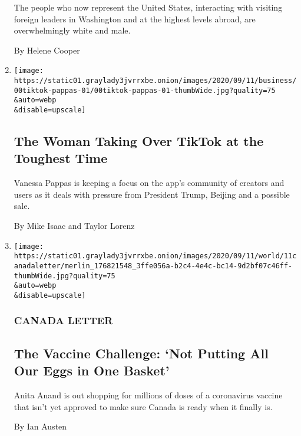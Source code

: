 \begin{enumerate}
  The people who now represent the United States, interacting with
  visiting foreign leaders in Washington and at the highest levels
  abroad, are overwhelmingly white and male.

  By Helene Cooper
\item
  \href{/2020/09/11/technology/tiktok-vanessa-pappas-bytedance.html}{}

  \texttt{[image: https://static01.graylady3jvrrxbe.onion/images/2020/09/11/business/00tiktok-pappas-01/00tiktok-pappas-01-thumbWide.jpg?quality=75\\\&auto=webp\\\&disable=upscale]}

  \hypertarget{the-woman-taking-over-tiktok-at-the-toughest-time}{%
  \subsection{The Woman Taking Over TikTok at the Toughest
  Time}\label{the-woman-taking-over-tiktok-at-the-toughest-time}}

  Vanessa Pappas is keeping a focus on the app's community of creators
  and users as it deals with pressure from President Trump, Beijing and
  a possible sale.

  By Mike Isaac and Taylor Lorenz
\item
  \href{/2020/09/11/world/canada/the-vaccine-challenge-not-putting-all-our-eggs-in-one-basket.html}{}

  \texttt{[image: https://static01.graylady3jvrrxbe.onion/images/2020/09/11/world/11canadaletter/merlin\_176821548\_3ffe056a-b2c4-4e4c-bc14-9d2bf07c46ff-thumbWide.jpg?quality=75\\\&auto=webp\\\&disable=upscale]}

  \hypertarget{canada-letter}{%
  \subsubsection{CANADA LETTER}\label{canada-letter}}

  \hypertarget{the-vaccine-challenge-not-putting-all-our-eggs-in-one-basket}{%
  \subsection{The Vaccine Challenge: `Not Putting All Our Eggs in One
  Basket'}\label{the-vaccine-challenge-not-putting-all-our-eggs-in-one-basket}}

  Anita Anand is out shopping for millions of doses of a coronavirus
  vaccine that isn't yet approved to make sure Canada is ready when it
  finally is.

  By Ian Austen
\end{enumerate}

